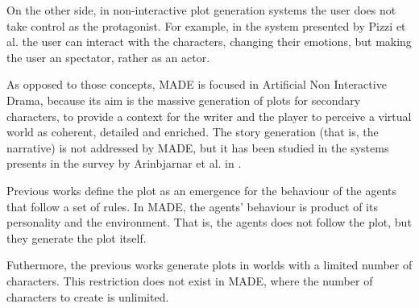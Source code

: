 \documentclass[runningheads]{llncs}
\begin{document}

On the other side, in non-interactive plot generation systems the user does not take control as the protagonist. For example, in the system presented by Pizzi et al. \cite{pizzi2007interactive} the user can interact with the characters, changing their emotions, but making the user an spectator, rather as an actor.



As opposed to those concepts, MADE is focused in Artificial Non Interactive Drama, because its aim is the massive generation of plots for secondary characters, to provide a context for the writer and the player to perceive a virtual world as coherent, detailed and enriched. The story generation (that is, the narrative) is not addressed by MADE, but it has been studied in the systems presents in the survey by Arinbjarnar et al. in \cite{ReviewArinbjarnar09}.



Previous works define the plot as an emergence for the behaviour of the agents that follow a set of rules. In MADE, the agents' behaviour is product of its personality and the environment. That is, the agents does not follow the plot, but they generate the plot itself. 


Futhermore, the previous works generate plots in worlds with a limited number of characters. This restriction does not exist in MADE, where the number of characters to create is unlimited.





\end{document}
